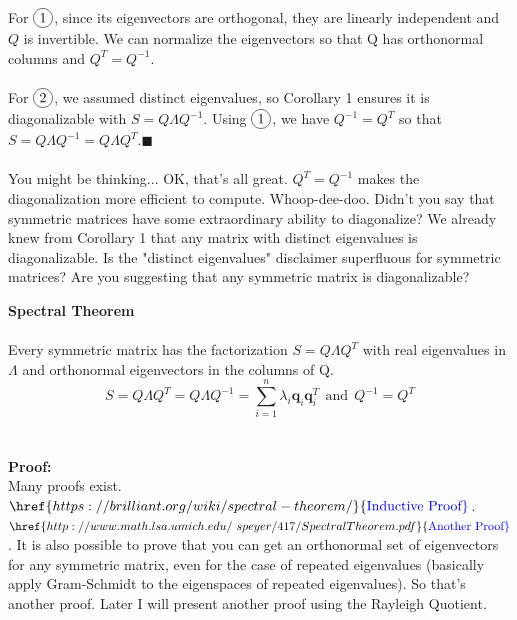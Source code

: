 \documentclass{tufte-handout}
\newcommand*\circled[1]{\tikz[baseline=(char.base)]{
		\node[shape=circle,draw,inner sep=2pt] (char) {#1};}}
\renewcommand{\qedsymbol}{$\blacksquare$}
\newcommand{\Waynehref}[3][blue]{\href{#2}{\color{#1}{#3}}}%
\begin{document}
\noindent For $\circled{1}$, since its eigenvectors are orthogonal, they are linearly independent and $Q$ is invertible. We can normalize the eigenvectors so that Q has orthonormal columns and $Q^T=Q^{-1}$.\\\leavevmode\\

\noindent For $\circled{2}$, we assumed distinct eigenvalues, so Corollary 1 ensures it is diagonalizable with $S=Q\Lambda Q^{-1}$. Using $\circled{1}$, we have $Q^{-1}=Q^T$ so that $S=Q\Lambda Q^{-1}=Q\Lambda Q^T$.\quad\qedsymbol\\\leavevmode\\

\noindent You might be thinking... OK, that's all great. $Q^T=Q^{-1}$ makes the diagonalization more efficient to compute. Whoop-dee-doo. Didn't you say that symmetric matrices have some extraordinary ability to diagonalize? We already knew from Corollary 1 that any matrix with distinct eigenvalues is diagonalizable. Is the "distinct eigenvalues" disclaimer superfluous for symmetric matrices? Are you suggesting that any symmetric matrix is diagonalizable?

\[\]
{\Large\textbf{Spectral Theorem}}\\\leavevmode\\
\noindent Every symmetric matrix has the factorization $S=Q\Lambda Q^{T}$ with real eigenvalues in $\Lambda$ and orthonormal eigenvectors in the columns of Q.
\[
S=Q\Lambda Q^{T}=Q\Lambda Q^{-1}=\sum_{i=1}^{n}\lambda_i\mathbf{q}_i\mathbf{q}_i^T~~\text{and}~~Q^{-1}=Q^T
\]\\\leavevmode\\
\noindent\textbf{Proof:}\\
\noindent Many proofs exist. $\Waynehref{https://brilliant.org/wiki/spectral-theorem/}{\text{Inductive Proof}}$. $\Waynehref{http://www.math.lsa.umich.edu/~speyer/417/SpectralTheorem.pdf}{\text{Another Proof}}$. It is also possible to prove that you can get an orthonormal set of eigenvectors for any symmetric matrix, even for the case of repeated eigenvalues (basically apply Gram-Schmidt to the eigenspaces of repeated eigenvalues). So that's another proof. Later I will present another proof using the Rayleigh Quotient.
\end{document}
